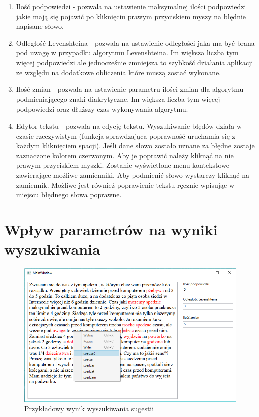 \begin{enumerate}
	\item Ilość podpowiedzi - pozwala na ustawienie maksymalnej ilości podpowiedzi jakie mają się pojawić po kliknięciu prawym przyciskiem myszy na błędnie napisane słowo.
	\item Odległość Levenshteina - pozwala na ustawienie odległości jaka ma być brana pod uwagę w przypadku algorytmu Levenshteina. Im większa liczba tym więcej podpowiedzi ale jednocześnie zmniejsza to szybkość działania aplikacji ze względu na dodatkowe obliczenia które muszą zostać wykonane. 
	\item Ilość zmian - pozwala na ustawienie parametru ilości zmian dla algorytmu podmieniającego znaki diakrytyczne. Im większa liczba tym więcej podpowiedzi oraz dłuższy czas wykonywania algorytmu.
	\item Edytor tekstu - pozwala na edycję tekstu. Wyszukiwanie błędów działa w czasie rzeczywistym (funkcja sprawdzająca poprawność uruchamia się z każdym kliknięciem spacji). Jeśli dane słowo zostało uznane za błędne zostaje zaznaczone kolorem czerwonym. Aby je poprawić należy kliknąć na nie prawym przyciskiem myszki. Zostanie wyświetlone menu kontekstowe zawierające możliwe zamienniki. Aby podmienić słowo wystarczy kliknąć na zamiennik. Możliwe jest również poprawienie tekstu ręcznie wpisując w miejscu błędnego słowa poprawne. 
	
\end{enumerate}

\section{Wpływ parametrów na wyniki wyszukiwania}

\begin{figure} [H]
	\centering
	\includegraphics[width=1\linewidth]{rozdzial03/screen2.png}
	\caption{Przykładowy wynik wyszukiwania sugestii}
	\label{fig:interfejs1}
\end{figure}

